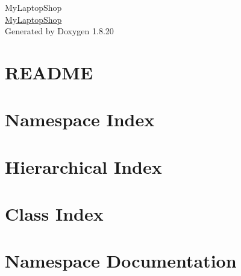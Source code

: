 \let\mypdfximage\pdfximage\def\pdfximage{\immediate\mypdfximage}\documentclass[twoside]{book}
\newcommand{\+}{\discretionary{\mbox{\scriptsize$\hookleftarrow$}}{}{}}
\newcommand{\clearemptydoublepage}{%
  \newpage{\pagestyle{empty}\cleardoublepage}%
}
\begin{document}
\hypersetup{pageanchor=false,
             bookmarksnumbered=true,
             pdfencoding=unicode
            }
\begin{titlepage}
\vspace*{7cm}
\begin{center}%
{\Large My\+Laptop\+Shop \\[1ex]\large \mbox{\hyperlink{namespace_my_laptop_shop}{My\+Laptop\+Shop}} }\\
\vspace*{1cm}
{\large Generated by Doxygen 1.8.20}\\
\end{center}
\end{titlepage}
\clearemptydoublepage
{}
\tableofcontents
\clearemptydoublepage
{}
\hypersetup{pageanchor=true}

\chapter{R\+E\+A\+D\+ME}
\label{md__c___users__schmidt__kriszti_xC3_xA1n__documents_oenik_prog3_2020_2_a1lax5__r_e_a_d_m_e}

\chapter{Namespace Index}

\chapter{Hierarchical Index}

\chapter{Class Index}

\chapter{Namespace Documentation}










\end{document}
